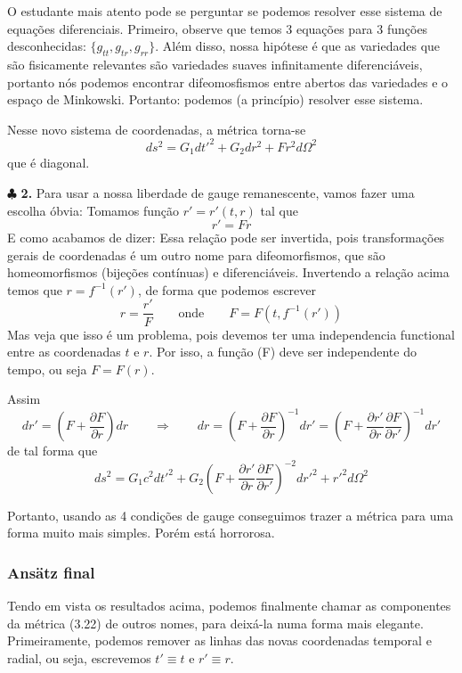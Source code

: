\documentclass[11pt]{article}
\begin{document}
O estudante mais atento pode se perguntar se podemos resolver esse
sistema de equações diferenciais. Primeiro, observe que temos 3 equações
para 3 funções desconhecidas: \(\{g_{tt}, g_{tr}, g_{rr}\}\). Além
disso, nossa hipótese é que as variedades que são fisicamente relevantes
são variedades suaves infinitamente diferenciáveis, portanto nós podemos
encontrar difeomosfismos entre abertos das variedades e o espaço de
Minkowski. Portanto: podemos (a princípio) resolver esse sistema.

Nesse novo sistema de coordenadas, a métrica torna-se
\[ \tag{3.19} ds^2 = G_1 dt'^2 + G_2 dr^2 + F r^2 d \Omega^2  \] que é
diagonal.

    \(\clubsuit\) \textbf{2.} Para usar a nossa liberdade de gauge
remanescente, vamos fazer uma escolha óbvia: Tomamos função
\(r'=r'(t,r)\) tal que \[ \tag{3.20} r' = F r\] E como acabamos de
dizer: Essa relação pode ser invertida, pois transformações gerais de
coordenadas é um outro nome para difeomorfismos, que são homeomorfismos
(bijeções contínuas) e diferenciáveis. Invertendo a relação acima temos
que \(r = f^{-1}(r')\), de forma que podemos escrever
\[\tag{3.21.a} r = \frac{r'}{F}\qquad \text{onde} \qquad F = F(t, f^{-1}(r')) \]
Mas veja que isso é um problema, pois devemos ter uma independencia
functional entre as coordenadas \(t\) e \(r\). Por isso, a função (F)
deve ser independente do tempo, ou seja \(F = F(r)\).

Assim
\[ \tag{3.21.b} dr' = \left(F + \frac{\partial F}{\partial r} \right) dr \qquad \Rightarrow \qquad dr = \left(F + \frac{\partial F}{\partial r} \right)^{-1} dr' = \left(F + \frac{\partial r'}{\partial r}\frac{\partial F}{\partial r'} \right)^{-1} dr'\]
de tal forma que
\[ \tag{3.22} ds^2 = G_1 c^2 dt'^2 + G_2 \left(F + \frac{\partial r'}{\partial r} \frac{\partial F}{\partial r'} \right)^{-2} dr'^2 + r'^2 d \Omega^2  \]

Portanto, usando as 4 condições de gauge conseguimos trazer a métrica
para uma forma muito mais simples. Porém está horrorosa.

    \hypertarget{ansuxe4tz-final}{%
\subsubsection{Ansätz final}\label{ansuxe4tz-final}}

    Tendo em vista os resultados acima, podemos finalmente chamar as
componentes da métrica (3.22) de outros nomes, para deixá-la numa forma
mais elegante. Primeiramente, podemos remover as linhas das novas
coordenadas temporal e radial, ou seja, escrevemos \(t' \equiv t\) e
\(r' \equiv r\).
\end{document}
